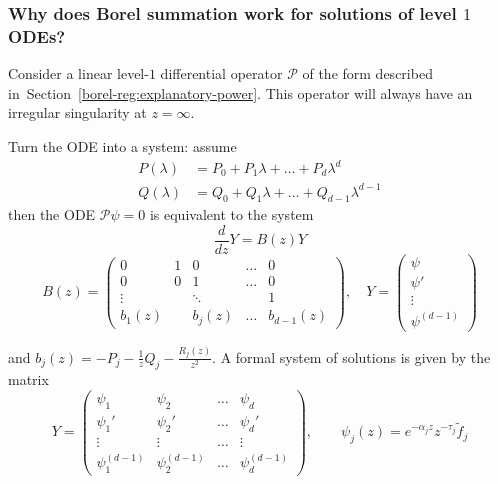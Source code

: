 \documentclass{article}
\theoremstyle{definition}
\theoremstyle{plain}
\newenvironment{verify}{\color{ForestGreen}}{\color{black}}
\begin{document}
\subsubsection{Why does Borel summation work for solutions of level $1$ ODEs?}\label{sec:why_borel_ODE}
%
Consider a linear level-$1$ differential operator $\mathcal{P}$ of the form described in~Section~\ref{borel-reg:explanatory-power}. This operator will always have an irregular singularity at $z = \infty$.
\begin{verify}
\par
Turn the ODE into a system: assume 
\begin{align*}
P(\lambda) & = P_0 + P_1 \lambda + \ldots + P_d \lambda^d \\
Q(\lambda) & = Q_0 + Q_1 \lambda + \ldots + Q_{d-1} \lambda^{d-1}
\end{align*}
then the ODE $\mathcal{P}\psi=0$ is equivalent to the system 
    \begin{equation}
        \frac{d}{dz}Y= B(z) Y 
    \end{equation}
    \[
    B(z)=\begin{pmatrix}
            0 & 1 & 0 & \ldots & 0 \\
            0 & 0 & 1 & \ldots & 0 \\
            \vdots & &\ddots & & 1\\
            b_{1}(z) & & b_j(z) & \ldots & b_{d-1}(z)
        \end{pmatrix}, \quad Y=\begin{pmatrix}
            \psi \\
            \psi ' \\
            \vdots \\
            \psi^{(d-1)}
        \end{pmatrix}
    \]
    
 and $b_j(z)=-P_j-\frac{1}{z}Q_j-\frac{R_j(z)}{z^2}$. A formal system of solutions is given by the matrix 
\begin{equation}
    Y=\begin{pmatrix}
       \psi_1 & \psi_2 & \ldots & \psi_d  \\
       \psi_1' & \psi_2' & \ldots & \psi_d'  \\
       \vdots & \vdots  & \ldots & \vdots  \\
       \psi_1^{(d-1)} & \psi_2^{(d-1)} & \ldots & \psi_d^{(d-1)} 
    \end{pmatrix}, \qquad \psi_j(z)=e^{-\alpha_j z}z^{-\tau_j}\tilde{f}_j
\end{equation} 


\end{verify}
\end{document}
